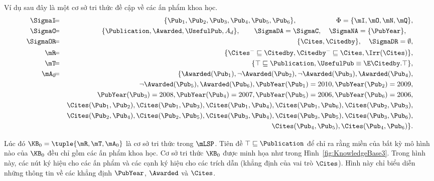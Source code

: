 \begin{Example}
	\label{ex:KnowledgeBase3}
	Ví dụ sau đây là một cơ sở tri thức đề cập về các ấn phẩm khoa học.
	\allowdisplaybreaks
	\begin{eqnarray*}
		\SigmaI \!\!\!&=&\!\!\! \{\Pub_1, \Pub_2, \Pub_3, \Pub_4, \Pub_5, \Pub_6\},\qquad\qquad\quad\;\,\, \Phi = \{\mI,\mO,\mN,\mQ\},\\
		\SigmaC \!\!\!&=&\!\!\! \{\Publication, \Awarded, \UsefulPub, A_d\}, \qquad \SigmaDA = \SigmaC, \quad \SigmaNA = \{\PubYear\}, \quad\\
		\SigmaOR \!\!\!&=&\!\!\! \{\Cites, \Citedby\}, \quad \SigmaDR = \emptyset,\\
		\mR    \!\!\!&=&\!\!\! \{\Cites^- \sqsubseteq \Citedby, \Citedby^- \sqsubseteq \Cites, \Irr(\Cites) \}, \\
		\mT    \!\!\!&=&\!\!\! \{\top \sqsubseteq \Publication, \UsefulPub \equiv \E \Citedby.\top\},\\
		\mA_0 \!\!\!&=&\!\!\! \{\Awarded(\Pub_1), \neg\Awarded(\Pub_2), \neg\Awarded(\Pub_3), \Awarded(\Pub_4), \\
		\!\!\!& & \neg\Awarded(\Pub_5), \Awarded(\Pub_6), 
		\PubYear(\Pub_1) = 2010, \PubYear(\Pub_2) = 2009, \\
		\!\!\!& & \PubYear(\Pub_3) = 2008, \PubYear(\Pub_4) = 2007, 
		\PubYear(\Pub_5) = 2006, \PubYear(\Pub_6) = 2006, \\
		\!\!\!& & \Cites(\Pub_1, \Pub_2), \Cites(\Pub_1, \Pub_3), \Cites(\Pub_1, \Pub_4), 
		\Cites(\Pub_1, \Pub_6), \Cites(\Pub_2, \Pub_3), \\
		\!\!\!& & \Cites(\Pub_2, \Pub_4), \Cites(\Pub_2, \Pub_5), \Cites(\Pub_3, \Pub_4), \Cites(\Pub_3, \Pub_5), \Cites(\Pub_3, \Pub_6),\\
		\!\!\!& & \Cites(\Pub_4, \Pub_5), \Cites(\Pub_4, \Pub_6)\}.
	\end{eqnarray*}
	
	Lúc đó $\KB_0 = \tuple{\mR,\mT,\mA_0}$ là cơ sở tri thức trong $\mLSP$. Tiên đề $\top \sqsubseteq \Publication$ để chỉ ra rằng miền của bất kỳ mô hình nào của $\KB_0$ đều chỉ gồm các ấn phẩm khoa học.
	Cơ sở tri thức $\KB_0$ được minh họa như trong Hình~\ref{fig:KnowledgeBase3}. Trong hình này, các nút ký hiệu cho các ấn phẩm và các cạnh ký hiệu cho các trích dẫn (khẳng định của vai trò $\Cites$). Hình này chỉ biểu diễn những thông tin về các khẳng định $\PubYear$, $\Awarded$ và $\Cites$.\myend
\end{Example}

